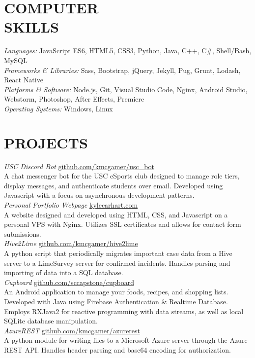 \documentclass[line,margin]{res}
\begin{document}
\begin{resume}
\section{COMPUTER \\ SKILLS} {\sl Languages:} 
				JavaScript ES6, HTML5, CSS3, Python, Java, 
				C++, C\#, Shell/Bash, MySQL \\
                {\sl Frameworks \& Libraries:}
                Sass, Bootstrap, jQuery, Jekyll, Pug, Grunt, Lodash, React Native\\
                {\sl Platforms \& Software:}
                Node.js, Git, Visual Studio Code, Nginx, Android Studio, 
                Webstorm, Photoshop, After Effects, Premiere\\
                {\sl Operating Systems:}
                Windows, Linux
                
\section{PROJECTS} {\sl USC Discord Bot} \hfill \href{https://www.github.com/kmcgamer/usc_bot}{github.com/kmcgamer/usc\_bot} \\
				A chat messenger bot for the USC eSports club designed to manage role tiers, display messages, and authenticate students over email. Developed using Javascript with a focus on asynchronous development patterns. \\[5pt]
				{\sl Personal Portfolio Webpage} \hfill \href{https://www.kylecarhart.com}{kylecarhart.com} \\
				A website designed and developed using HTML, CSS, and Javascript on a personal VPS with Nginx. Utilizes SSL certificates and allows for contact form submissions.\\[5pt]
				{\sl Hive2Lime} \hfill \href{https://www.github.com/kmcgamer/hive2lime}{github.com/kmcgamer/hive2lime} \\
				A python script that periodically migrates important case data from a Hive server to a LimeSurvey server for confirmed incidents. Handles parsing and importing of data into a SQL database.\\[5pt]
				{\sl Cupboard} \hfill \href{https://www.github.com/sccapstone/cupboard}{github.com/sccapstone/cupboard} \\
				An Android application to manage your foods, recipes, and shopping lists. Developed with Java using Firebase Authentication \& Realtime Database. Employs RXJava2 for reactive programming with data streams, as well as local SQLite database manipulation. \\[5pt]
				{\sl AzureREST} \hfill \href{https://www.github.com/kmcgamer/azurerest}{github.com/kmcgamer/azurerest} \\
				A python module for writing files to a Microsoft Azure server through the Azure REST API. Handles header parsing and base64 encoding for authorization.
 

\end{resume}
\end{document}
